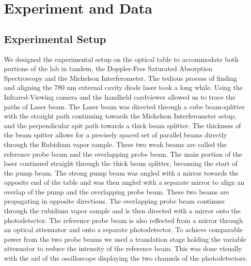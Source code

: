 \documentclass[12pt]{article}
\begin{document}
\section*{Experiment and Data}

\subsection*{Experimental Setup}
We designed the experimental setup on the optical table to accommodate both portions of the lab in tandem, the Doppler-Free Saturated Absorption Spectroscopy and the Michelson Interferometer. The tedious process of finding and aligning the 780 nm external cavity diode laser took a long while. Using the Infrared-Viewing camera and the handheld cardviewer allowed us to trace the paths of Laser beam. The Laser beam was directed through a cube beam-splitter with the straight path continuing towards the Michelson Interferometer setup, and the perpendicular spit path towards a thick beam splitter. The thickness of the beam spitter allows for a precisely spaced set of parallel beams directly through the Rubidium vapor sample. These two weak beams are called the reference probe beam and the overlapping probe beam. The main portion of the laser continued straight through the thick beam splitter, becoming the start of the pump beam. The strong pump beam was angled with a mirror towards the opposite end of the table and was then angled with a separate mirror to align an overlap of the pump and the overlapping probe beam. These two beams are propagating in opposite directions. The overlapping probe beam continues through the rubidium vapor sample and is then directed with a mirror onto the photodetector. The reference probe beam is also reflected from a mirror through an optical attenuator and onto a separate photodetector. To achieve comparable power from the two probe beams we used a translation stage holding the variable attenuator to reduce the intensity of the reference beam. This was done visually with the aid of the oscilloscope  displaying the two channels of the photodetectors. 
\end{document}
